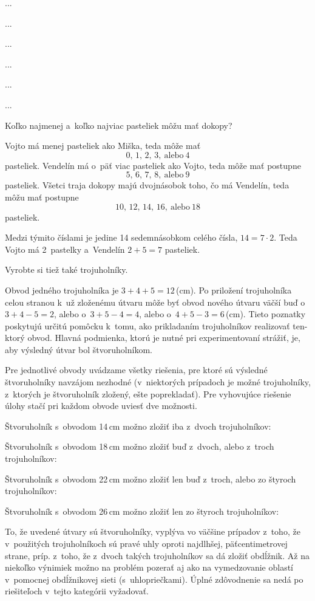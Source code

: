 ﻿{%
...}

{%
...}

{%
...}

{%
...}

{%
...}

{%
...}

{%
\napad
Koľko najmenej a~koľko najviac pasteliek môžu mať dokopy?

\riesenie
Vojto má menej pasteliek ako Miška, teda môže mať
$$0,\,1,\,2,\,3,\ \text{alebo}\ 4$$
pasteliek.
Vendelín má o~päť viac pasteliek ako Vojto, teda môže mať postupne
$$5,\,6,\,7,\,8,\ \text{alebo}\ 9$$
pasteliek.
Všetci traja dokopy majú dvojnásobok toho, čo má Vendelín, teda môžu mať postupne
$$10,\,12,\,14,\,16,\ \text{alebo}\ 18$$
pasteliek.

Medzi týmito číslami je jedine 14 sedemnásobkom celého čísla, $14=7\cdot 2$.
Teda Vojto má 2~pastelky a~Vendelín $2+5=7$ pasteliek.
}

{%
\napad
Vyrobte si tiež také trojuholníky.

\riesenie
Obvod jedného trojuholníka je $3+4+5=12$\,(cm).
Po priložení trojuholníka celou stranou k~už zloženému útvaru môže byť obvod nového útvaru väčší buď o~$3+4-5=2$, alebo o~$3+5-4=4$, alebo o~$4+5-3=6$\,(cm).
Tieto poznatky poskytujú určitú pomôcku k~tomu, ako prikladaním trojuholníkov realizovať ten-ktorý obvod.
Hlavná podmienka, ktorú je nutné pri experimentovaní strážiť, je, aby výsledný útvar bol štvoruholníkom.

Pre jednotlivé obvody uvádzame všetky riešenia, pre ktoré sú výsledné štvoruholníky navzájom nezhodné (v~niektorých prípadoch je možné trojuholníky, z~ktorých je štvoruholník zložený, ešte poprekladať).
Pre vyhovujúce riešenie úlohy stačí pri každom obvode uviesť dve možnosti.

Štvoruholník s~obvodom 14\,cm možno zložiť iba z~dvoch trojuholníkov:
%


Štvoruholník s~obvodom 18\,cm možno zložiť buď z~dvoch, alebo z~troch trojuholníkov:
%


Štvoruholník s~obvodom 22\,cm možno zložiť len buď z~troch, alebo zo štyroch trojuholníkov:
%


Štvoruholník s~obvodom 26\,cm možno zložiť len zo štyroch trojuholníkov:
%


\poznamka
To, že uvedené útvary sú štvoruholníky, vyplýva vo väčšine prípadov z~toho, že v~použitých trojuholníkoch sú pravé uhly oproti najdlhšej, päťcentimetrovej strane, príp. z~toho, že z~dvoch takých trojuholníkov sa dá zložiť obdĺžnik.
Až na niekoľko výnimiek možno na problém pozerať aj ako na vymedzovanie oblastí v~pomocnej obdĺžnikovej sieti (s~uhlopriečkami).
Úplné zdôvodnenie sa nedá po riešiteľoch v~tejto kategórii vyžadovať.

}

